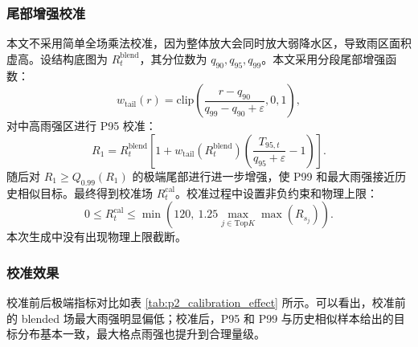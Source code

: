 \documentclass[UTF8,a4paper,zihao=5]{ctexart}
\numberwithin{equation}{section}
\numberwithin{figure}{section}
\numberwithin{table}{section}
\begin{document}
\subsubsection{尾部增强校准}

本文不采用简单全场乘法校准，因为整体放大会同时放大弱降水区，导致雨区面积虚高。设结构底图为 $R_t^{\mathrm{blend}}$，其分位数为 $q_{90},q_{95},q_{99}$。本文采用分段尾部增强函数：
\begin{equation}
w_{\mathrm{tail}}(r)
=
\mathrm{clip}
\left(
\frac{r-q_{90}}{q_{99}-q_{90}+\varepsilon},0,1
\right),
\end{equation}
对中高雨强区进行 P95 校准：
\begin{equation}
R_1
=
R_t^{\mathrm{blend}}
\left[
1+w_{\mathrm{tail}}(R_t^{\mathrm{blend}})
\left(
\frac{T_{95,t}}{q_{95}+\varepsilon}-1
\right)
\right].
\end{equation}
随后对 $R_1\ge Q_{0.99}(R_1)$ 的极端尾部进行进一步增强，使 P99 和最大雨强接近历史相似目标。最终得到校准场 $R_t^{\mathrm{cal}}$。校准过程中设置非负约束和物理上限：
\begin{equation}
0\le R_t^{\mathrm{cal}}\le
\min\left(120,\ 1.25\max_{j\in\mathrm{Top}K}\max(R_{s_j})\right).
\end{equation}
本次生成中没有出现物理上限截断。

\subsubsection{校准效果}

校准前后极端指标对比如表 \ref{tab:p2_calibration_effect} 所示。可以看出，校准前的 blended 场最大雨强明显偏低；校准后，P95 和 P99 与历史相似样本给出的目标分布基本一致，最大格点雨强也提升到合理量级。

\begin{table}[H]
\centering
\caption{极端分位数校准前后指标对比}
\label{tab:p2_calibration_effect}
\end{table}
\end{document}
